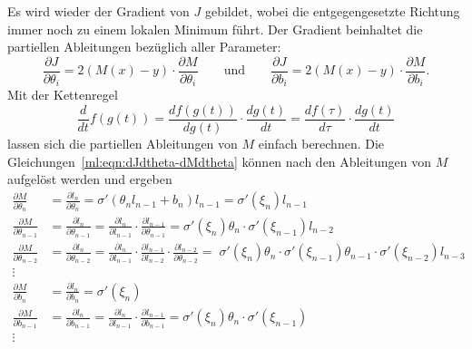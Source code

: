 Es wird wieder der Gradient von $J$ gebildet, wobei die entgegengesetzte Richtung immer
noch zu einem lokalen Minimum führt.
Der Gradient beinhaltet die partiellen Ableitungen
bezüglich aller Parameter:
\begin{equation}
    \frac{\partial J}{\partial \theta_i} = 2(M(x) - y) \cdot \frac{\partial M}{\partial \theta_i}
    \qquad\text{und}\qquad
    \frac{\partial J}{\partial b_i} = 2(M(x) - y) \cdot \frac{\partial M}{\partial b_i}.
\label{ml:eqn:dJdtheta-dMdtheta}
\end{equation}
Mit der Kettenregel
\begin{equation}
    \frac{d}{dt}f(g(t)) = \frac{df(g(t))}{d g(t)} \cdot \frac{d g(t)}{dt} = \frac{df(\tau)}{d \tau} \cdot \frac{d g(t)}{dt}
\end{equation}
lassen sich die partiellen Ableitungen von $M$ einfach berechnen.
Die Gleichungen~\eqref{ml:eqn:dJdtheta-dMdtheta} können nach den 
Ableitungen von $M$ aufgelöst werden und ergeben
\begin{equation}
\begin{aligned}
    \frac{\partial M}{\partial \theta_n} &= \frac{\partial l_n}{\partial \theta_n} =
    \sigma'(\theta_n l_{n-1} + b_n) l_{n-1} = \sigma'(\xi_n)l_{n-1} \\
    \frac{\partial M}{\partial \theta_{n-1}} &= \frac{\partial l_{n}}{\partial \theta_{n-1}}
    = \frac{\partial l_n}{\partial l_{n-1}} \cdot \frac{\partial
    l_{n-1}}{\partial \theta_{n-1}} = 
    \sigma'(\xi_n) \theta_n \cdot \sigma'(\xi_{n-1}) l_{n-2}
    \\
    \frac{\partial M}{\partial \theta_{n-2}} &= \frac{\partial l_{n}}{\partial \theta_{n-2}}
    = \frac{\partial l_n}{\partial l_{n-1}} \cdot \frac{\partial
    l_{n-1}}{\partial l_{n-2}}\cdot \frac{\partial l_{n-2}}{\partial \theta_{n-2}} =
    \; \sigma'(\xi_n)\theta_n \cdot \sigma'(\xi_{n-1})\theta_{n-1}\cdot \sigma'(\xi_{n-2})l_{n-3}
    \\
    \vdots\quad&\\
    \frac{\partial M}{\partial b_n} &= \frac{\partial l_n}{\partial b_n} =
    \sigma'(\xi_n) \\
    \frac{\partial M}{\partial b_{n-1}} &= \frac{\partial l_{n}}{\partial b_{n-1}}
    = \frac{\partial l_n}{\partial l_{n-1}} \cdot \frac{\partial
    l_{n-1}}{\partial b_{n-1}} = 
    \sigma'(\xi_n) \theta_n \cdot \sigma'(\xi_{n-1}) \\
    \vdots\quad&
\end{aligned}
\end{equation}
